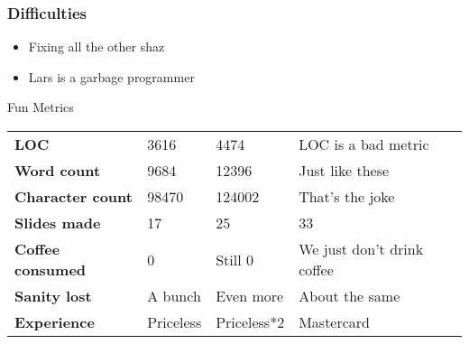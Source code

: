 \documentclass{beamer}
\begin{document}
\begin{frame}
\frametitle{Difficulties}
\begin{itemize}
\item Fixing all the other shaz
\item Lars is a garbage programmer
\end{itemize}
\end{frame}

\begin{frame}
\begin{block}{Fun Metrics}
\begin{tabular}{l || l | l | l}
\textbf{LOC} & 3616 & 4474 & LOC is a bad metric\\
\textbf{Word count} & 9684 & 12396 & Just like these\\
\textbf{Character count} & 98470 & 124002 & That's the joke\\
\textbf{Slides made} & 17 & 25 & 33\\
\textbf{Coffee consumed} & 0 & Still 0 & We just don't drink coffee\\
\textbf{Sanity lost} & A bunch & Even more & About the same\\
\textbf{Experience} & Priceless & Priceless*2 & Mastercard
\end{tabular}
\end{block}
\end{frame}

\begin{frame}
\end{frame}
\end{document}
